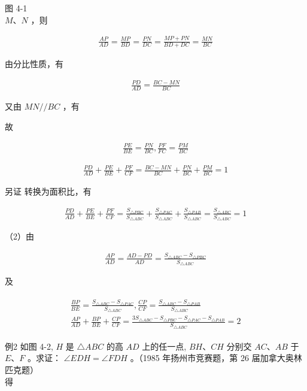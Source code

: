 \documentclass[10pt]{article}
\begin{document}
图 4-1\\
$M 、 N$ ，则

\begin{align*}
\frac{A P}{A D}=\frac{M P}{B D}=\frac{P N}{D C}=\frac{M P+P N}{B D+D C}=\frac{M N}{B C}
\end{align*}

由分比性质，有

\begin{align*}
\frac{P D}{A D}=\frac{B C-M N}{B C}
\end{align*}

又由 $M N / / B C$ ，有

故

\begin{align*}
\frac{P E}{B E}=\frac{P N}{B C}, \frac{P F}{F C}=\frac{P M}{B C}
\end{align*}

\begin{align*}
\frac{P D}{A D}+\frac{P E}{B E}+\frac{P F}{C F}=\frac{B C-M N}{B C}+\frac{P N}{B C}+\frac{P M}{B C}=1
\end{align*}

另证 转换为面积比，有

\begin{align*}
\frac{P D}{A D}+\frac{P E}{B E}+\frac{P F}{C F}=\frac{S_{\triangle P B C}}{S_{\triangle A B C}}+\frac{S_{\triangle P A C}}{S_{\triangle A B C}}+\frac{S_{\triangle P A B}}{S_{\triangle A B C}}=\frac{S_{\triangle A B C}}{S_{\triangle A B C}}=1
\end{align*}

（2）由

\begin{align*}
\frac{A P}{A D}=\frac{A D-P D}{A D}=\frac{S_{\triangle A B C}-S_{\triangle P B C}}{S_{\triangle A B C}}
\end{align*}

及

\begin{align*}
\begin{gathered}
\frac{B P}{B E}=\frac{S_{\triangle A B C}-S_{\triangle P A C}}{S_{\triangle A B C}}, \frac{C P}{C F}=\frac{S_{\triangle A B C}-S_{\triangle P A B}}{S_{\triangle A B C}} \\
\frac{A P}{A D}+\frac{B P}{B E}+\frac{C P}{C F}=\frac{3 S_{\triangle A B C}-S_{\triangle P B C}-S_{\triangle P A C}-S_{\triangle P A B}}{S_{\triangle A B C}}=2
\end{gathered}
\end{align*}

例2 如图 4-2, $H$ 是 $\triangle A B C$ 的高 $A D$ 上的任一点, $B H 、 C H$ 分别交 $A C 、 A B$ 于 $E 、 F$ 。求证： $\angle E D H=\angle F D H$ 。（1985 年扬州市竞赛题，第 26 届加拿大奥林匹克题）\\
得
\end{document}

